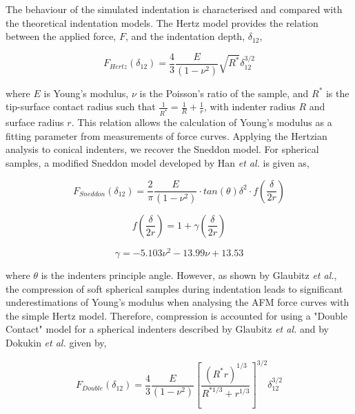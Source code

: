 The behaviour of the simulated indentation is characterised and compared with the theoretical indentation models. The Hertz model provides the relation between the applied force, $F$, and the indentation depth, $\delta_{12}$, \cite{hertz1881contact,hertz1882contact,hertz1896contact}

\begin{equation} F_{Hertz}(\delta_{12}) =  \frac{4}{3} \frac{E}{(1-\nu^2)} \sqrt{R^*} \delta_{12}^{3/2} \label{eq: Hertz} \end{equation}

where $E$ is Young’s modulus, $\nu$ is the Poisson’s ratio of the sample, and $R^*$ is the tip-surface contact radius such that $\frac{1}{R^*} = \frac{1}{R} + \frac{1}{r}$, with indenter radius $R$ and surface radius $r$. This relation allows the calculation of Young's modulus as a fitting parameter from measurements of force curves\cite{vinckier1998measuring, kontomaris2018hertz,kontomaris2020hertz}. Applying the Hertzian analysis to conical indenters, we recover the Sneddon model. For spherical samples, a modified Sneddon model developed by Han \textit{et al.}\cite{han2021modified} is given as,

\begin{equation}F_{Sneddon}(\delta_{12}) = \frac{2}{\pi}\frac{E}{(1-\nu^2)} \cdot tan(\theta)\delta^{2} \cdot f\left(\frac{\delta}{2r}\right)\label{eq: Sneddon}\end{equation}

\begin{equation}  f\left(\frac{\delta}{2r}\right) = 1+ \gamma \left(\frac{\delta}{2r}\right) \end{equation}

\begin{equation} \gamma = -5.103\nu^2 - 13.99\nu + 13.53 \end{equation}

where $\theta$ is the indenters principle angle. However, as shown by Glaubitz \textit{et al.}\cite{glaubitz2014novel}, the compression of soft spherical samples during indentation leads to significant underestimations of Young's modulus when analysing the AFM force curves with the simple Hertz model. Therefore, compression is accounted for using a "Double Contact" model for a spherical indenters described by Glaubitz \textit{et al.}\cite{glaubitz2014novel} and by Dokukin \textit{et al.}\cite{dokukin2013quantitative} given by,

\begin{equation}  F_{Double}(\delta_{12}) =  \frac{4}{3} \frac{E}{(1-\nu^2)} \left[ \frac{(R^*r)^{1/3}}{R^{* 1/3}+r^{1/3}} \right]^{3/2}\delta_{12}^{3/2} \label{eq: Hertz Double Contact}\end{equation}

